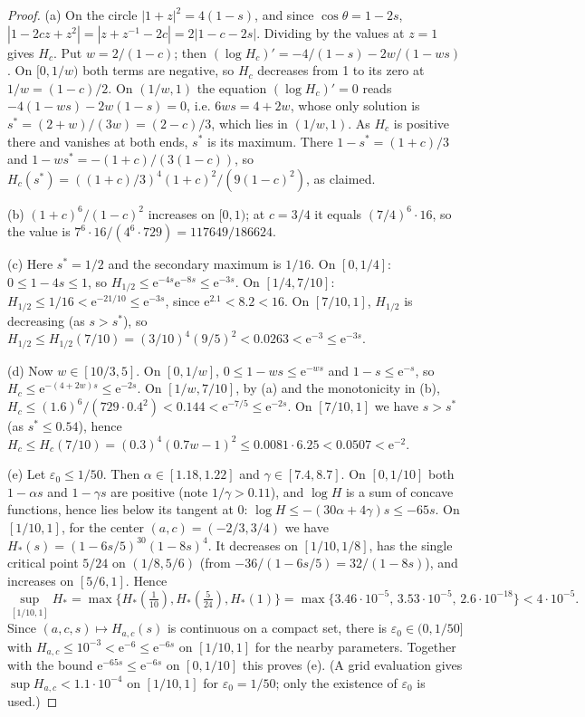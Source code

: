 \documentclass[11pt]{article}
\theoremstyle{remark}\newtheorem{remark}[theorem]{Remark}
\newcommand{\ee}{\mathrm e}
\begin{document}
\begin{proof}
(a) On the circle \(|1+z|^2=4(1-s)\), and since \(\cos\theta=1-2s\),
\(|1-2cz+z^2|=|z+z^{-1}-2c|=2|1-c-2s|\). Dividing by the values at
\(z=1\) gives \(H_c\). Put \(w=2/(1-c)\); then
\((\log H_c)'=-4/(1-s)-2w/(1-ws)\). On \([0,1/w)\) both terms are
negative, so \(H_c\) decreases from 1 to its zero at \(1/w=(1-c)/2\).
On \((1/w,1)\) the equation \((\log H_c)'=0\) reads
\(-4(1-ws)-2w(1-s)=0\), i.e. \(6ws=4+2w\), whose only solution is
\(s^*=(2+w)/(3w)=(2-c)/3\), which lies in \((1/w,1)\). As \(H_c\) is
positive there and vanishes at both ends, \(s^*\) is its maximum. There
\(1-s^*=(1+c)/3\) and \(1-ws^*=-(1+c)/(3(1-c))\), so
\(H_c(s^*)=((1+c)/3)^4(1+c)^2/(9(1-c)^2)\), as claimed.

(b) \((1+c)^6/(1-c)^2\) increases on \([0,1)\); at \(c=3/4\) it equals
\((7/4)^6\cdot16\), so the value is \(7^6\cdot16/(4^6\cdot729)=
117649/186624\).

(c) Here \(s^*=1/2\) and the secondary maximum is \(1/16\). On
\([0,1/4]\): \(0\le1-4s\le1\), so
\(H_{1/2}\le\ee^{-4s}\ee^{-8s}\le\ee^{-3s}\). On \([1/4,7/10]\):
\(H_{1/2}\le1/16<\ee^{-21/10}\le\ee^{-3s}\), since \(\ee^{2.1}<8.2<16\).
On \([7/10,1]\), \(H_{1/2}\) is decreasing (as \(s>s^*\)), so
\(H_{1/2}\le H_{1/2}(7/10)=(3/10)^4(9/5)^2<0.0263<\ee^{-3}\le\ee^{-3s}\).

(d) Now \(w\in[10/3,5]\). On \([0,1/w]\), \(0\le1-ws\le\ee^{-ws}\) and
\(1-s\le\ee^{-s}\), so \(H_c\le\ee^{-(4+2w)s}\le\ee^{-2s}\). On
\([1/w,7/10]\), by (a) and the monotonicity in (b),
\(H_c\le(1.6)^6/(729\cdot0.4^2)<0.144<\ee^{-7/5}\le\ee^{-2s}\). On
\([7/10,1]\) we have \(s>s^*\) (as \(s^*\le0.54\)), hence
\(H_c\le H_c(7/10)=(0.3)^4(0.7w-1)^2\le0.0081\cdot6.25<0.0507<\ee^{-2}\).

(e) Let \(\varepsilon_0\le1/50\). Then \(\alpha\in[1.18,1.22]\) and
\(\gamma\in[7.4,8.7]\). On \([0,1/10]\) both \(1-\alpha s\) and
\(1-\gamma s\) are positive (note \(1/\gamma>0.11\)), and \(\log H\)
is a sum of concave functions, hence lies below its tangent at \(0\):
\(\log H\le-(30\alpha+4\gamma)s\le-65s\). On \([1/10,1]\), for the
center \((a,c)=(-2/3,3/4)\) we have
\(H_*(s)=(1-6s/5)^{30}(1-8s)^4\). It decreases on \([1/10,1/8]\), has
the single critical point \(5/24\) on \((1/8,5/6)\) (from
\(-36/(1-6s/5)=32/(1-8s)\)), and increases on \([5/6,1]\). Hence
\[
 \sup_{[1/10,1]}H_*=\max\{H_*(\tfrac1{10}),H_*(\tfrac5{24}),H_*(1)\}
 =\max\{3.46\cdot10^{-5},\,3.53\cdot10^{-5},\,2.6\cdot10^{-18}\}
 <4\cdot10^{-5}.
\]
Since \((a,c,s)\mapsto H_{a,c}(s)\) is continuous on a compact set,
there is \(\varepsilon_0\in(0,1/50]\) with \(H_{a,c}\le10^{-3}<\ee^{-6}\le\ee^{-6s}\)
on \([1/10,1]\) for the nearby parameters. Together with the
bound \(\ee^{-65s}\le\ee^{-6s}\) on \([0,1/10]\) this proves (e). (A grid
evaluation gives \(\sup H_{a,c}<1.1\cdot10^{-4}\) on \([1/10,1]\) for
\(\varepsilon_0=1/50\); only the existence of \(\varepsilon_0\) is used.)
\end{proof}
\end{document}
